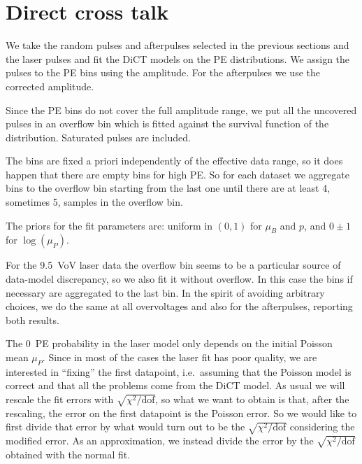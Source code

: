 \begin{figure}
    
    
    
\end{figure}

\section{Direct cross talk}

We take the random pulses and afterpulses selected in the previous sections and
the laser pulses and fit the DiCT models on the PE distributions. We assign the
pulses to the PE bins using the amplitude. For the afterpulses we use the
corrected amplitude.

Since the PE bins do not cover the full amplitude range, we put all the
uncovered pulses in an overflow bin which is fitted against the survival
function of the distribution. Saturated pulses are included.

The bins are fixed a priori independently of the effective data range, so it
does happen that there are empty bins for high PE. So for each dataset we
aggregate bins to the overflow bin starting from the last one until there are
at least 4, sometimes 5, samples in the overflow bin.

The priors for the fit parameters are: uniform in $(0,1)$ for $\mu_B$ and $p$,
and $0 \pm 1$ for $\log(\mu_P)$.

For the \SI{9.5}{VoV} laser data the overflow bin seems to be a particular
source of data-model discrepancy, so we also fit it without overflow. In this
case the bins if necessary are aggregated to the last bin. In the spirit of
avoiding arbitrary choices, we do the same at all overvoltages and also for the
afterpulses, reporting both results.

The 0~PE probability in the laser model only depends on the initial Poisson
mean $\mu_P$. Since in most of the cases the laser fit has poor quality, we are
interested in ``fixing'' the first datapoint, i.e.\ assuming that the Poisson
model is correct and that all the problems come from the DiCT model. As usual
we will rescale the fit errors with $\sqrt{\chi^2/\mathrm{dof}}$, so what we
want to obtain is that, after the rescaling, the error on the first datapoint
is the Poisson error. So we would like to first divide that error by what would
turn out to be the $\sqrt{\chi^2/\mathrm{dof}}$ considering the modified error.
As an approximation, we instead divide the error by the
$\sqrt{\chi^2/\mathrm{dof}}$ obtained with the normal fit.

